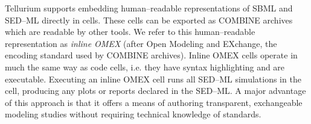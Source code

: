 \documentclass[10pt,letterpaper]{article}
\begin{document}


Tellurium supports embedding human--readable representations of SBML \cite{smith2009antimony} and SED--ML \cite{choi2016phrased} directly in cells. These cells can be exported as COMBINE archives which are readable by other tools. We refer to this human--readable representation as \textit{inline OMEX} (after Open Modeling and EXchange, the encoding standard used by COMBINE archives).
Inline OMEX cells operate in much the same way as code cells, i.e. they have syntax highlighting and are executable. Executing an inline OMEX cell runs all SED--ML simulations in the cell, producing any plots or reports declared in the SED--ML. A major advantage of this approach is that it offers a means of authoring transparent, exchangeable modeling studies without requiring technical knowledge of standards.


\end{document}
